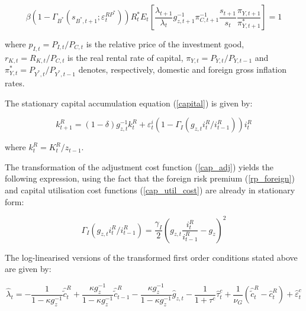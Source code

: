 \documentclass[a4paper,11pt]{article}
\numberwithin{equation}{section}
\begin{document}
	\begin{equation} 
	\beta\left(1-\Gamma_{B^*}\left(s_{B^*,t+1};\varepsilon_t^{RP^*}\right)\right)R^*_tE_t\left[\frac{\lambda_{t+1}}{\lambda_t}g_{z,t+1}^{-1}\pi_{C,t+1}^{-1}\frac{s_{t+1}}{s_t}\frac{\pi_{Y,t+1}}{\pi^*_{Y,t+1}}\right]=1
	\end{equation}
	
	where $p_{I,t}=P_{I,t}/P_{C,t}$ is the relative price of the investment good, $r_{K,t}=R_{K,t}/P_{C,t}$ is the real rental rate of capital, {} $\pi_{Y,t}=P_{Y,t}/P_{Y,t-1}$ and $\pi^*_{Y,t}=P_{Y^*,t}/P_{Y^*,t-1}$ denotes, respectively, domestic and foreign gross inflation rates. 
	
	The stationary capital accumulation equation (\ref{capital}) is given by:
	
	\begin{equation} \label{trans_cap}
	k_{t+1}^R=(1-\delta)g_{z,t}^{-1}k_t^R+\varepsilon_t^i\left(1-\Gamma_I\left(g_{z,t}i_t^R/i_{t-1}^R\right)\right)i_t^R
	\end{equation}
	
	where $k_t^R=K_t^R/z_{t-1}$. 
	
	The transformation of the adjustment cost function (\ref{cap_adj}) yields the following expression, using the fact that the foreign risk premium (\ref{rp_foreign}) and capital utilisation cost functions (\ref{cap_util_cost}) are already in stationary form:
	
	\begin{equation} \label{adj_trans}
	\Gamma_I\left(g_{z,t}i_t^R/i_{t-1}^R\right)=\frac{\gamma_I}{2}\left(g_{z,t}\frac{i_t^R}{i_{t-1}^R}-g_z\right)^2
	\end{equation}
	
	The log-linearised versions of the transformed first order conditions stated above are given by:
	
	\begin{equation}
	\hat{\lambda}_t=-\frac{1}{1-\kappa g_z^{-1}}\hat{\tilde{c}}_t^R+\frac{\kappa g_z^{-1}}{1-\kappa g_z^{-1}}\hat{\tilde{c}}_{t-1}^R-\frac{\kappa g_z^{-1}}{1-\kappa g_z^{-1}}\hat{g}_{z,t}-\frac{1}{1+\tau^c}\hat{\tau}_t^c+\frac{1}{\nu_G}\left(\hat{\tilde{c}}_t^R-\hat{c}_t^R\right)+\hat{\varepsilon}_t^c
	\end{equation}
	
\end{document}
